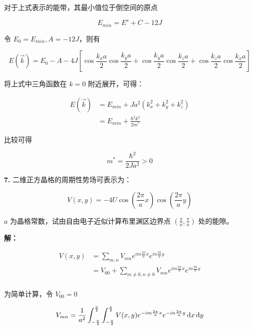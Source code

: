 对于上式表示的能带，其最小值位于倒空间的原点

\begin{equation*}
    E_{min} = E^s + C - 12J
\end{equation*}

令 $E_0 = E_{min}, A=-12J$，则有

\begin{equation*}
    E(\vec{k}) = E_0 - A - 4J \left[\cos{\frac{k_x a}{2}}\cos{\frac{k_y a}{2}} + \cos{\frac{k_y a}{2}}\cos{\frac{k_z a}{2}} + \cos{\frac{k_z a}{2}}\cos{\frac{k_x a}{2}}\right]
\end{equation*}

将上式中三角函数在 $k=0$ 附近展开，可得：

\begin{align*}
    E(\vec{k}) &= E_{min} + J a^2 (k_x^2+k_y^2+k_z^2) \\
    &= E_{min} + \frac{\hbar^2 k^2}{2 m^*}
\end{align*}

比较可得

\begin{equation*}
    m^* = \frac{\hbar^2}{2J a^2} > 0
\end{equation*}

\noindent \textbf{7.\quad} 二维正方晶格的周期性势场可表示为：

\begin{equation*}
    V(x, y) = -4U \cos\left(\frac{2\pi}{a}x\right) \cos\left(\frac{2\pi}{a}y\right)
\end{equation*}

$a$ 为晶格常数，试由自由电子近似计算布里渊区边界点 $(\frac{\pi}{a}, \frac{\pi}{a})$ 处的能隙。

\noindent \textbf{解：}

\begin{align*}
    V(x, y) &= \sum_{m, n} V_{mn} e^{im\frac{2\pi}{a}x} e^{in\frac{2\pi}{a}y} \\
    &= V_{00} + \sum_{m\ne 0, n\ne 0} V_{mn} e^{im\frac{2\pi}{a}x} e^{in\frac{2\pi}{a}y} \\
\end{align*}

为简单计算，令 $V_{00}=0$

\begin{equation*}
    V_{mn} = \frac{1}{a^2} \int_{-\frac{a}{2}}^{\frac{a}{2}} \int_{-\frac{a}{2}}^{\frac{a}{2}} V(x, y) e^{-im\frac{2\pi}{a}x} e^{-in\frac{2\pi}{a}y} \mathop{}\!\mathrm{d} x \mathop{}\!\mathrm{d} y
\end{equation*}

